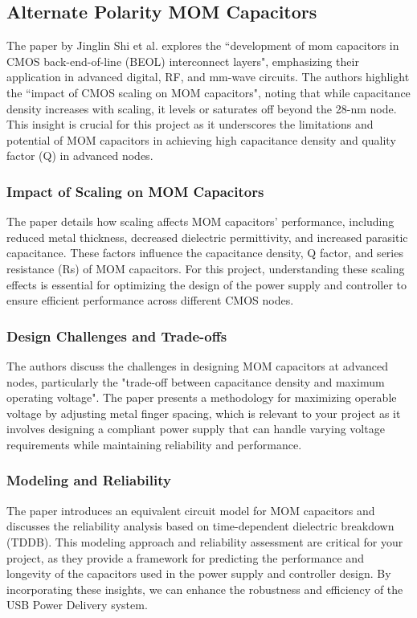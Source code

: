 \subsection{Alternate Polarity MOM Capacitors}
The paper by Jinglin Shi et al.\cite{apmom_gf} explores the “development of \gls{mom} capacitors in CMOS back-end-of-line (BEOL) interconnect layers", emphasizing their application in advanced digital, RF, and mm-wave circuits. The authors highlight the “impact of CMOS scaling on MOM capacitors", noting that while capacitance density increases with scaling, it levels or saturates off beyond the 28-nm node. This insight is crucial for this project as it underscores the limitations and potential of MOM capacitors in achieving high capacitance density and quality factor (Q) in advanced nodes\cite{er8}.

\subsubsection{Impact of Scaling on MOM Capacitors}
 The paper details how scaling affects MOM capacitors’ performance, including reduced metal thickness, decreased dielectric permittivity, and increased parasitic capacitance. These factors influence the capacitance density, Q factor, and series resistance (Rs) of MOM capacitors. For this project, understanding these scaling effects is essential for optimizing the design of the power supply and controller to ensure efficient performance across different CMOS nodes\cite{er7}.

\subsubsection{Design Challenges and Trade-offs}
 The authors discuss the challenges in designing MOM capacitors at advanced nodes, particularly the "trade-off between capacitance density and maximum operating voltage". The paper presents a methodology for maximizing operable voltage by adjusting metal finger spacing, which is relevant to your project as it involves designing a compliant power supply that can handle varying voltage requirements while maintaining reliability and performance\cite{er6}.

\subsubsection{Modeling and Reliability}
 The paper introduces an equivalent circuit model for MOM capacitors and discusses the reliability analysis based on time-dependent dielectric breakdown (TDDB). This modeling approach and reliability assessment are critical for your project, as they provide a framework for predicting the performance and longevity of the capacitors used in the power supply and controller design. By incorporating these insights, we can enhance the robustness and efficiency of the USB Power Delivery system\cite{er5}.
